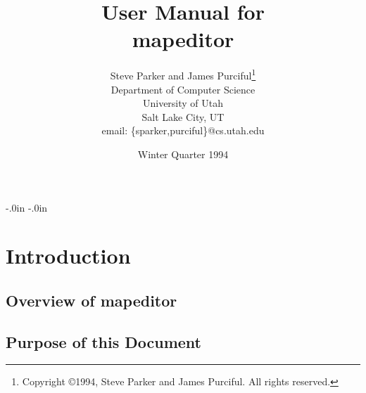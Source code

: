 % 
% 
%

\topmargin -0.45in
\textheight 9.0in
\oddsidemargin -.0in
\evensidemargin -.0in
\textwidth 6.5in





\setlength{\baselineskip}{1.2\baselineskip}

\setlength{\parskip}{\smallskipamount}


\title {User Manual for\\
mapeditor}

\author {Steve Parker and James Purciful\thanks{Copyright \copyright 1994,
Steve Parker and James Purciful.  All rights reserved.}\\ 
Department of Computer Science\\ 
University of Utah\\ 
Salt Lake City, UT\\ 
email: \{sparker,purciful\}@cs.utah.edu}

\date {Winter Quarter 1994}



\maketitle

\tableofcontents



\chapter{Introduction}


\section{Overview of mapeditor}


\section{Purpose of this Document}


